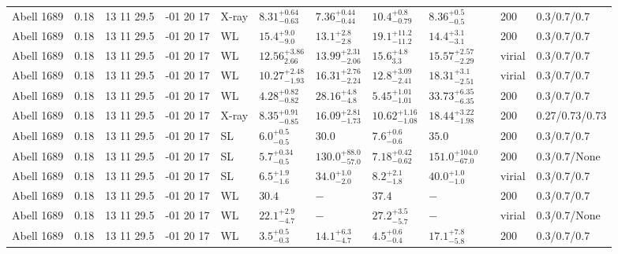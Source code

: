 \begin{landscape}
\begin{center}
{\begin{longtable}{llllllllllll}
Abell 1689 & 0.18 & 13 11 29.5 & -01 20 17 & X-ray & ${8.31}^{+0.64}_{-0.63}$ & ${7.36}^{+0.44}_{-0.44}$ & ${10.4}^{+0.8}_{-0.79}$ & ${8.36}^{+0.5}_{-0.5}$ & \citet{ET11.1} & 200 & 0.3/0.7/0.7 \\
Abell 1689 & 0.18 & 13 11 29.5 & -01 20 17 & WL & ${15.4}^{+9.0}_{-9.0}$ & ${13.1}^{+2.8}_{-2.8}$ & ${19.1}^{+11.2}_{-11.2}$ & ${14.4}^{+3.1}_{-3.1}$ & \citet{CO09.1} & 200 & 0.3/0.7/0.7 \\
Abell 1689 & 0.18 & 13 11 29.5 & -01 20 17 & WL & ${12.56}^{+3.86}_{2.66}$ & ${13.99}^{+2.31}_{-2.06}$ & ${15.6}^{+4.8}_{3.3}$ & ${15.57}^{+2.57}_{-2.29}$ & \citet{UM09.1} & virial & 0.3/0.7/0.7 \\
Abell 1689 & 0.18 & 13 11 29.5 & -01 20 17 & WL & ${10.27}^{+2.48}_{-1.93}$ & ${16.31}^{+2.76}_{-2.24}$ & ${12.8}^{+3.09}_{-2.41}$ & ${18.31}^{+3.1}_{-2.51}$ & \citet{UM11.1} & virial & 0.3/0.7/0.7 \\
Abell 1689 & 0.18 & 13 11 29.5 & -01 20 17 & WL & ${4.28}^{+0.82}_{-0.82}$ & ${28.16}^{+4.8}_{-4.8}$ & ${5.45}^{+1.01}_{-1.01}$ & ${33.73}^{+6.35}_{-6.35}$ & \citet{BA07.1} & 200 & 0.3/0.7/0.7 \\
Abell 1689 & 0.18 & 13 11 29.5 & -01 20 17 & X-ray & ${8.35}^{+0.91}_{-0.85}$ & ${16.09}^{+2.81}_{-1.73}$ & ${10.62}^{+1.16}_{-1.08}$ & ${18.44}^{+3.22}_{-1.98}$ & \citet{BA14.1} & 200 & 0.27/0.73/0.73 \\
Abell 1689 & 0.18 & 13 11 29.5 & -01 20 17 & SL & ${6.0}^{+0.5}_{-0.5}$ & ${30.0}^{}_{}$ & ${7.6}^{+0.6}_{-0.6}$ & ${35.0}^{}_{}$ & \citet{HA06.1} & 200 & 0.3/0.7/0.7 \\
Abell 1689 & 0.18 & 13 11 29.5 & -01 20 17 & SL & ${5.7}^{+0.34}_{-0.5}$ & ${130.0}^{+88.0}_{-57.0}$ & ${7.18}^{+0.42}_{-0.62}$ & ${151.0}^{+104.0}_{-67.0}$ & \citet{ZE06.1} & 200 & 0.3/0.7/None \\
Abell 1689 & 0.18 & 13 11 29.5 & -01 20 17 & SL & ${6.5}^{+1.9}_{-1.6}$ & ${34.0}^{+1.0}_{-2.0}$ & ${8.2}^{+2.1}_{-1.8}$ & ${40.0}^{+1.0}_{-1.0}$ & \citet{BR05.2} & virial & 0.3/0.7/0.7 \\
Abell 1689 & 0.18 & 13 11 29.5 & -01 20 17 & WL & ${30.4}^{}_{}$ & ${-}^{}_{}$ & ${37.4}^{}_{}$ & ${-}^{}_{}$ & \citet{HA06.1} & 200 & 0.3/0.7/0.7 \\
Abell 1689 & 0.18 & 13 11 29.5 & -01 20 17 & WL & ${22.1}^{+2.9}_{-4.7}$ & ${-}^{}_{}$ & ${27.2}^{+3.5}_{-5.7}$ & ${-}^{}_{}$ & \citet{ME07.1} & virial & 0.3/0.7/None \\
Abell 1689 & 0.18 & 13 11 29.5 & -01 20 17 & WL & ${3.5}^{+0.5}_{-0.3}$ & ${14.1}^{+6.3}_{-4.7}$ & ${4.5}^{+0.6}_{-0.4}$ & ${17.1}^{+7.8}_{-5.8}$ & \citet{BA05.1} & 200 & 0.3/0.7/0.7 \\

\end{longtable}}
\end{center}
\end{landscape}

